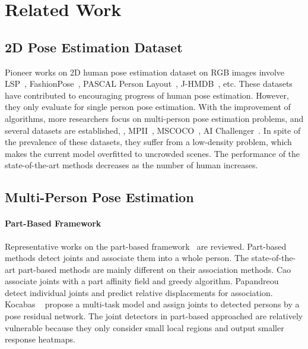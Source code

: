 \documentclass[10pt,twocolumn,letterpaper]{article}
\begin{document}
\vspace{-0.1in}
\section{Related Work}
\subsection{{2D} Pose Estimation Dataset}
Pioneer works on 2D human pose estimation dataset on RGB images involve LSP~\cite{lsp}, FashionPose~\cite{fashionpose}, PASCAL Person Layout~\cite{pascal}, J-HMDB~\cite{jhmdb}, etc. These datasets have contributed to encouraging progress of human pose estimation. However, they only evaluate for single person pose estimation. With the improvement of algorithms, more researchers focus on multi-person pose estimation problems, and several datasets are established, \eg, MPII~\cite{mpii}, MSCOCO~\cite{mscoco}, AI Challenger~\cite{aic}. In spite of the prevalence of these datasets, they suffer from a low-density problem, which makes the current model overfitted to uncrowded scenes. The performance of the state-of-the-art methods decreases as the number of human increases.

\subsection{Multi-Person Pose Estimation}
\paragraph{Part-Based Framework}
Representative works on the part-based framework~\cite{cao, papandreou2018personlab, kocabas2018multiposenet} are reviewed. Part-based methods detect joints and associate them into a whole person. The state-of-the-art part-based methods are mainly different on their association methods. Cao \etal~\cite{cao} associate joints with a part affinity field and greedy algorithm. Papandreou \etal~\cite{papandreou2018personlab} detect individual joints and predict relative displacements for association. Kocabas \etal~\cite{kocabas2018multiposenet} propose a multi-task model and assign joints to detected persons by a pose residual network. The joint detectors in part-based approached are relatively vulnerable because they only consider small local regions and output smaller response heatmaps. 

\vspace{-0.1in}
\end{document}
